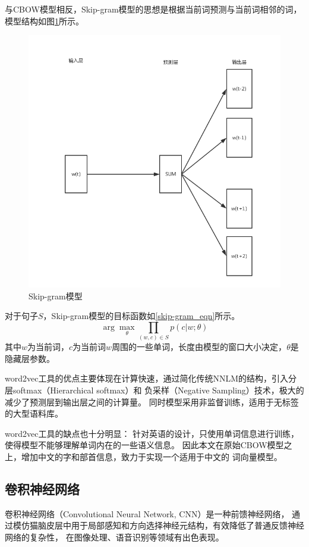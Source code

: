 与CBOW模型相反，Skip-gram模型的思想是根据当前词预测与当前词相邻的词，模型结构如图\ref{skip-gram}所示。
\begin{figure}[h]
    \includegraphics[scale=0.6]{picture/skip-gram.png}
    \caption{Skip-gram模型}
    \label{skip-gram}
\end{figure}
对于句子$S$，Skip-gram模型的目标函数如\ref{skip-gram_eqn}所示。
\begin{equation}
    \arg \max_{\theta } \prod_{\left ( w,c \right )\in S}p\left ( c|w;\theta \right )
    \label{skip-gram_eqn}
\end{equation}
其中$w$为当前词，$c$为当前词$w$周围的一些单词，长度由模型的窗口大小决定，$\theta$是隐藏层参数。

word2vec工具的优点主要体现在计算快速，通过简化传统NNLM的结构，引入分层softmax（Hierarchical softmax）和
负采样（Negative Sampling）技术，极大的减少了预测层到输出层之间的计算量。
同时模型采用非监督训练，适用于无标签的大型语料库。

word2vec工具的缺点也十分明显：
针对英语的设计，只使用单词信息进行训练，使得模型不能够理解单词内在的一些语义信息。
因此本文在原始CBOW模型之上，增加中文的字和部首信息，致力于实现一个适用于中文的
词向量模型。
\subsection{卷积神经网络}
卷积神经网络（Convolutional Neural Network, CNN）是一种前馈神经网络，
通过模仿猫脑皮层中用于局部感知和方向选择神经元结构，有效降低了普通反馈神经网络的复杂性，
在图像处理、语音识别等领域有出色表现。

